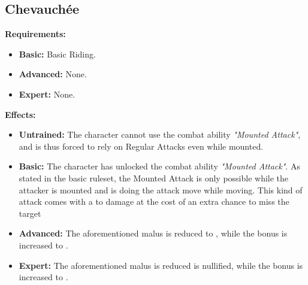 \documentclass[openany,10pt,a4paper]{book}
\begin{document}
\subsection{Chevauchée}
\begin{table}[!ht]
\centering
{}
\end{table}
\textbf{Requirements:}
\begin{itemize}
	\item \textbf{Basic:} Basic Riding.
	\item \textbf{Advanced:} None.
	\item \textbf{Expert:} None.
\end{itemize}
\textbf{Effects:}
\begin{itemize}
	\item \textbf{Untrained:} The character cannot use the combat ability \textit{"Mounted Attack"}, and is thus forced to rely on Regular Attacks even while mounted.
	\item \textbf{Basic:} The character has unlocked the combat ability \textit{"Mounted Attack"}. As stated in the basic ruleset, the Mounted Attack is only possible while the attacker is mounted and is doing the attack move while moving. This kind of attack comes with a  to damage at the cost of an extra  chance to miss the target
	\item \textbf{Advanced:} The aforementioned malus is reduced to , while the bonus is increased to .
	\item \textbf{Expert:} The aforementioned malus is reduced is nullified, while the bonus is increased to .
\end{itemize}\newpage
\end{document}

